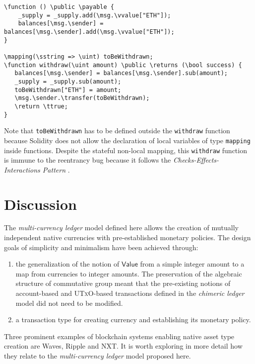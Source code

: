 \documentclass{llncs}
\newcommand{\utxo}{\textsc{UTxO}\xspace}
\newcommand{\type}[1]{\mathsf{#1}}
\newcommand{\valueT}{\type{Value}}
\newcommand{\blue}[1]{\textcolor[rgb]{0,0,1}{#1}}
\newcommand{\brown}[1]{\textcolor[rgb]{0.8,0.6,0.4}{#1}}
\newcommand{\green}[1]{\textcolor[rgb]{0.1,0.7,0.1}{#1}}
\newcommand{\verbsize}{\small}
\newcommand{\function}{\blue{function}}
\newcommand{\returns}{\blue{returns}}
\newcommand{\public}{\blue{public}}
\newcommand{\payable}{\blue{payable}}
\newcommand{\return}{\blue{return}}
\newcommand{\ttrue}{\green{true}}
\newcommand{\msg}{\green{msg}}
\newcommand{\vvalue}{\green{value}}
\newcommand{\sender}{\green{sender}}
\newcommand{\transfer}{\green{transfer}}
\newcommand{\sstring}{\brown{string}}
\newcommand{\uint}{\brown{uint}}
\newcommand{\bool}{\brown{bool}}
\newcommand{\mapping}{\brown{mapping}}
\begin{document}
\begin{small}
\begin{Verbatim}[commandchars=\\\?\?,fontsize=\verbsize]
\function () \public \payable {
    _supply = _supply.add(\msg.\vvalue["ETH"]);
    balances[\msg.\sender] = balances[\msg.\sender].add(\msg.\vvalue["ETH"]);
}

\mapping(\sstring => \uint) toBeWithdrawn; 
\function withdraw(\uint amount) \public \returns (\bool success) {
   balances[\msg.\sender] = balances[\msg.\sender].sub(amount);
   _supply = _supply.sub(amount);
   toBeWithdrawn["ETH"] = amount;
   \msg.\sender.\transfer(toBeWithdrawn);
   \return \ttrue;
}
\end{Verbatim}
\end{small}

Note that \verb+toBeWithdrawn+ has to be defined outside the \verb+withdraw+ function because Solidity does not allow the declaration of local variables of type \verb+mapping+ inside functions. Despite the stateful non-local mapping, this \verb+withdraw+ function is immune to the reentrancy bug because it follows the \emph{Checks-Effects-Interactions Pattern} \cite{SoliditySecurity}.


\section{Discussion}
\label{sec:Discussion}

The \emph{multi-currency ledger} model defined here allows the creation of mutually independent native currencies with pre-established monetary policies. The design goals of simplicity and minimalism have been achieved through:
\begin{enumerate}
\item the generalization of the notion of $\valueT$ from a simple integer amount to a map from currencies to integer amounts. The preservation of the algebraic structure of commutative group meant that the pre-existing notions of account-based and \utxo-based transactions defined in the \emph{chimeric ledger} model \cite{ChimericLedgers} did not need to be modified.

\item a transaction type for creating currency and establishing its monetary policy.
\end{enumerate}

Three prominent examples of blockchain systems enabling native asset type creation are Waves, Ripple and NXT. It is worth exploring in more detail how they relate to the \emph{multi-currency ledger} model proposed here. 
\end{document}
